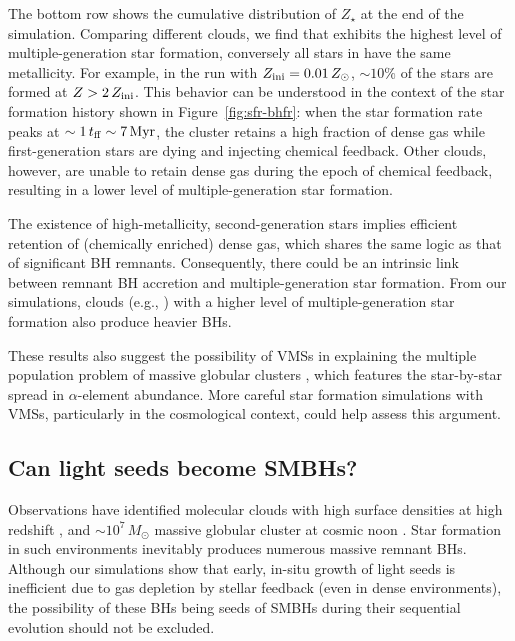 \documentclass[twocolumn]{aastex631}
\begin{document}
The bottom row shows the cumulative distribution of $Z_\star$ at the end of the simulation. Comparing different clouds, we find that  exhibits the highest level of multiple-generation star formation, conversely all stars in  have the same metallicity. For example, in the run with $Z_{\rm ini}=0.01\,Z_\odot$, $\sim 10\%$ of the stars are formed at $Z > 2\,Z_{\rm ini}$. This behavior can be understood in the context of the star formation history shown in Figure~\ref{fig:sfr-bhfr}: when the star formation rate peaks at $\sim 1\,t_{\rm ff} \sim 7\,\rm Myr$, the cluster retains a high fraction of dense gas while first-generation stars are dying and injecting chemical feedback. Other clouds, however, are unable to retain dense gas during the epoch of chemical feedback, resulting in a lower level of multiple-generation star formation.

The existence of high-metallicity, second-generation stars implies efficient retention of (chemically enriched) dense gas, which shares the same logic as that of significant BH remnants. Consequently, there could be an intrinsic link between remnant BH accretion and multiple-generation star formation. From our simulations, clouds (e.g., ) with a higher level of multiple-generation star formation also produce heavier BHs. 

These results also suggest the possibility of VMSs in explaining the multiple population problem of massive globular clusters \citep{BastianLardo_2018ARA&A..56...83B,MiloneMarino_2022Univ....8..359M}, which features the star-by-star spread in $\alpha$-element abundance. More careful star formation simulations with VMSs, particularly in the cosmological context, could help assess this argument.





\subsection{Can light seeds become SMBHs?}

Observations have identified molecular clouds with high surface densities at high redshift \citep{FujimotoOuchiKohno_2025NatAs...9.1553F}, and $\sim 10^7\,M_\odot$ massive globular cluster at cosmic noon \citep{PascaleDaiMcKee_2023ApJ...957...77P}. Star formation in such environments inevitably produces numerous massive remnant BHs. Although our simulations show that early, in-situ growth of light seeds is inefficient due to gas depletion by stellar feedback (even in dense environments), the possibility of these BHs being seeds of SMBHs during their sequential evolution should not be excluded.
\end{document}
